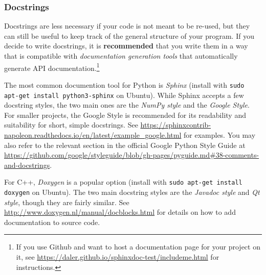 \documentclass[12pt]{article}
\begin{document}
\subsubsection{Docstrings}
Docstrings are less necessary if your code is not meant to be re-used, but they can still be useful to keep track of the general structure of your program. If you decide to write docstrings, it is \textbf{recommended} that you write them in a way that is compatible with \emph{documentation generation tools} that automatically generate API documentation.\footnote{If you use Github and want to host a documentation page for your project on it, see \url{https://daler.github.io/sphinxdoc-test/includeme.html} for instructions.}

The most common documention tool for Python is \emph{Sphinx} (install with \texttt{sudo apt-get install python3-sphinx} on Ubuntu). While Sphinx accepts a few docstring styles, the two main ones are the \emph{NumPy style} and the \emph{Google Style}. For smaller projects, the Google Style is recommended for its readability and suitability for short, simple docstrings. See \url{https://sphinxcontrib-napoleon.readthedocs.io/en/latest/example_google.html} for examples. You may also refer to the relevant section in the official Google Python Style Guide at \url{https://github.com/google/styleguide/blob/gh-pages/pyguide.md#38-comments-and-docstrings}.

For C++, \emph{Doxygen} is a popular option (install with \texttt{sudo apt-get install doxygen} on Ubuntu). The two main docstring styles are the \emph{Javadoc style} and \emph{Qt style}, though they are fairly similar. See \url{http://www.doxygen.nl/manual/docblocks.html} for details on how to add documentation to source code.

\end{document}
